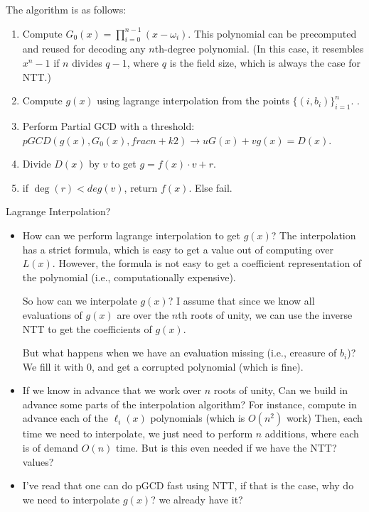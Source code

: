 The algorithm is as follows:
\begin{enumerate}
    \item Compute $G_0(x)=\prod_{i=0}^{n-1}(x-\omega_i)$. 
    This polynomial can be precomputed and reused for decoding any 
    $n$th-degree polynomial. 
    (In this case, it resembles $x^n-1$ if $n$ divides $q-1$,
    where $q$ is the field size, which is always the case for NTT.) 

    \item Compute $g(x)$ using lagrange interpolation from the points $\{(i,b_i)\}_{i=1}^{n}$.
    .

    \item Perform Partial GCD with a threshold:  $pGCD(g(x),G_0(x), 
    frac{n+k}{2})\rightarrow uG(x) +vg(x)=D(x)$. 

    \item Divide $D(x)$ by $v$ to get $g=f(x)\cdot v+r$.

    \item if $\deg(r)< deg(v)$, return $f(x)$. Else fail.
\end{enumerate}

\begin{bclogo}[logo=\bcquestion]{Lagrange Interpolation?}
    \begin{itemize}
        \item How can we perform lagrange interpolation to get $g(x)$? 
        The interpolation has a strict formula, which is easy to get
        a value out of computing over $L(x)$. However, the formula is not
        easy to get a coefficient representation of the polynomial (i.e., computationally
        expensive).
    
        So how can we interpolate $g(x)$? 
        I assume that since we know all evaluations of $g(x)$ are over 
        the $n$th roots of unity, we can use the inverse NTT to get the
        coefficients of $g(x)$.
    
        But what happens when we have an evaluation missing (i.e., ereasure of $b_i$)?
        We fill it with $0$, and get a corrupted polynomial (which is fine).

        \item If we know in advance that we work over $n$ roots of unity, 
        Can we build in advance some parts of the interpolation algorithm?
        For instance, compute in advance each  of the $\ell_i(x)$ polynomials (which is $O(n^2)$ work)
        Then, each time we need to interpolate, we just need to perform $n$ 
        additions, where each is of demand $O(n)$ time.
        But is this even needed if we have the NTT? values?

        \item I've read that one can do pGCD fast using NTT, if that is the case, 
        why do we need to interpolate $g(x)$? we already have it?
    \end{itemize}
    
\end{bclogo}
